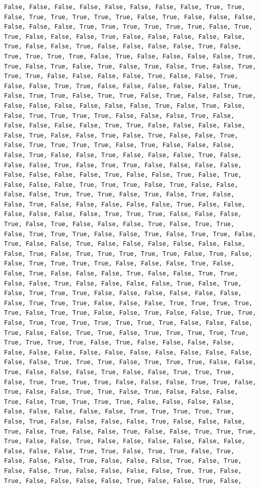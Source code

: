 \documentclass[
  letterpaper,
  DIV=11,
  numbers=noendperiod]{scrartcl}
\begin{document}
\begin{verbatim}
False, False, False, False, False, False, False, False, True, True, False, True, True, True, True, True, False, True, False, False, False, False, False, False, True, True, True, True, True, True, False, True, True, False, False, False, True, False, False, False, False, False, True, False, False, True, False, False, False, False, True, False, True, True, True, True, False, True, False, False, False, False, True, True, False, True, False, True, False, True, False, True, False, True, True, True, False, False, False, False, True, False, False, True, False, False, True, True, False, False, False, False, False, True, False, True, True, False, True, True, False, True, False, False, True, False, False, False, False, False, False, True, False, True, False, False, True, True, True, True, False, False, False, True, False, False, False, False, False, True, True, False, False, False, False, False, True, False, False, True, False, True, False, False, True, False, True, True, True, True, False, True, False, False, False, False, True, False, False, True, False, False, False, True, False, False, False, True, False, True, True, False, False, False, False, False, False, False, False, True, False, False, True, False, True, False, False, False, True, True, True, False, True, False, False, False, False, True, True, True, False, True, False, True, False, False, True, False, False, False, False, False, True, False, False, False, False, False, False, True, True, True, False, False, False, True, False, True, False, False, False, True, False, True, True, False, True, True, True, False, False, True, False, True, True, False, True, False, False, True, False, False, False, False, False, False, False, True, False, True, True, True, True, True, False, True, False, False, True, True, True, True, False, False, False, True, False, False, True, False, False, False, True, False, False, True, True, False, False, True, False, False, False, False, True, False, True, False, True, True, True, False, False, False, False, False, False, False, True, True, True, False, False, False, True, True, True, True, True, False, True, True, False, False, True, False, False, True, True, False, True, True, True, True, True, True, True, False, False, False, True, False, False, True, True, False, True, True, True, True, True, True, True, True, True, False, True, False, False, False, False, False, False, False, False, False, False, False, False, False, False, False, False, True, True, True, False, True, True, True, False, False, True, False, False, False, True, False, False, True, True, True, False, True, True, True, True, False, False, False, True, True, False, True, False, False, True, True, False, True, False, False, False, True, False, True, True, True, True, False, False, False, False, False, False, False, False, False, True, True, True, True, True, False, True, False, False, False, False, True, False, False, False, True, False, True, False, False, True, False, False, True, True, True, True, False, False, True, False, False, False, False, False, False, False, False, False, True, True, False, True, True, False, True, False, False, False, True, False, False, False, True, False, True, False, False, True, False, False, False, False, True, True, False, True, False, False, False, False, True, False, False, True, False, 
\end{verbatim}
\end{document}
